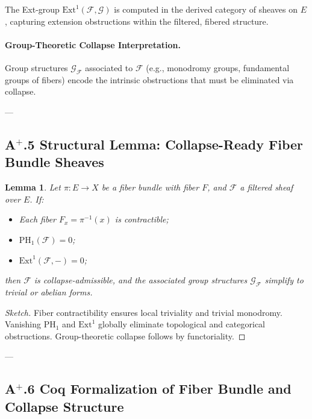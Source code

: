 \documentclass[11pt]{article}
\newtheorem{lemma}[theorem]{Lemma}
\begin{document}
The Ext-group $\mathrm{Ext}^1(\mathcal{F}, \mathcal{G})$ is computed in the derived category of sheaves on $E$, capturing extension obstructions within the filtered, fibered structure.

\paragraph{Group-Theoretic Collapse Interpretation.}

Group structures $\mathcal{G}_{\mathcal{F}}$ associated to $\mathcal{F}$ (e.g., monodromy groups, fundamental groups of fibers) encode the intrinsic obstructions that must be eliminated via collapse.

---

\subsection*{A$^{+}$.5 Structural Lemma: Collapse-Ready Fiber Bundle Sheaves}

\begin{lemma}
Let $\pi : E \to X$ be a fiber bundle with fiber $F$, and $\mathcal{F}$ a filtered sheaf over $E$. If:

\begin{itemize}
    \item Each fiber $F_x = \pi^{-1}(x)$ is contractible;
    \item $\mathrm{PH}_1(\mathcal{F}) = 0$;
    \item $\mathrm{Ext}^1(\mathcal{F}, -) = 0$;
\end{itemize}

then $\mathcal{F}$ is collapse-admissible, and the associated group structures $\mathcal{G}_{\mathcal{F}}$ simplify to trivial or abelian forms.
\end{lemma}

\begin{proof}[Sketch]
Fiber contractibility ensures local triviality and trivial monodromy. Vanishing $\mathrm{PH}_1$ and $\mathrm{Ext}^1$ globally eliminate topological and categorical obstructions. Group-theoretic collapse follows by functoriality.
\end{proof}

---

\subsection*{A$^{+}$.6 Coq Formalization of Fiber Bundle and Collapse Structure}
\end{document}
